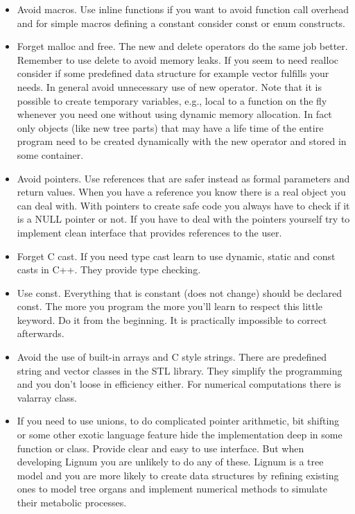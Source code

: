 \begin{itemize}
\item Avoid macros. Use inline functions if you want to avoid function
call overhead and for simple macros defining a constant consider const
or enum constructs.
\item Forget malloc and free. The new and delete operators do the
same job better.  Remember to use  delete to avoid memory leaks. If you
seem to  need realloc consider  if some predefined data  structure for
example vector fulfills your  needs.  In general avoid unnecessary use
of  new  operator.  Note  that  it  is  possible to  create  temporary
variables, e.g., local to a function  on the fly whenever you need one
without using  dynamic memory allocation.  In fact only  objects (like
new tree parts)  that may have a life time of  the entire program need
to be  created dynamically  with the new  operator and stored  in some
container.
\item Avoid pointers. Use references that are safer instead as
formal parameters  and return  values. When you  have a  reference you
know  there is  a real  object you  can deal  with.  With  pointers to
create safe code you  always have to check if it is  a NULL pointer or
not. If you  have to deal with the pointers  yourself try to implement
clean interface that provides references to the user.
\item Forget C cast. If you need type cast learn to use dynamic,
static and const casts in C++. They provide type checking.
\item Use const. Everything that is constant (does not change) should
be declared const. The more you program the more you'll learn to
respect this little keyword. Do it from the beginning. It is
practically impossible to correct afterwards.
\item Avoid the use of built-in arrays and C style strings. There are
predefined string and vector classes in the STL library. They simplify
the programming and you don't loose in efficiency either. For
numerical computations there is valarray class. 
\item If you need to use unions, to do complicated pointer arithmetic, bit
shifting   or   some  other   exotic   language   feature  hide   the
implementation deep in some function or class.  Provide clear and easy
to use  interface. But when developing  Lignum you are  unlikely to do
any of these. Lignum is a tree model and you are more likely to create
data structures  by refining  existing ones to  model tree  organs and
implement numerical methods to simulate their metabolic processes.

\end{itemize}

